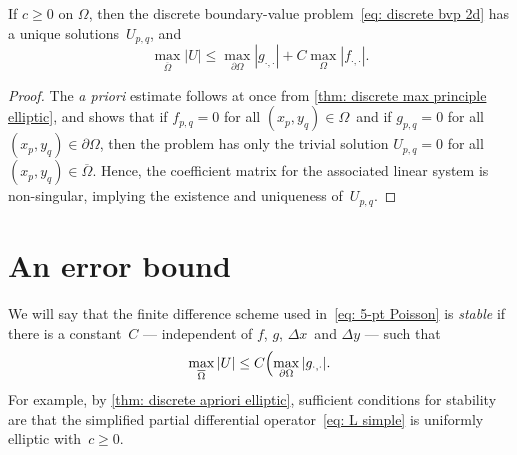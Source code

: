\begin{theorem}\label{thm: discrete apriori elliptic}
If $c\ge0$ on $\Omega$, then the discrete boundary-value 
problem~\eqref{eq: discrete bvp 2d} has a unique solutions~$U_{p,q}$, and
\[
\max_{\overline{\Omega}}|U|\le\max_{\partial\Omega}|g_{\cdot,\cdot}|
	+C\max_\Omega|f_{\cdot,\cdot}|.
\]
\end{theorem}
\begin{proof}
The \emph{a priori} estimate follows at once from 
\cref{thm: discrete max principle elliptic}, and shows that if $f_{p,q}=0$
for all $(x_p,y_q)\in\Omega$~and if $g_{p,q}=0$ for all 
$(x_p,y_q)\in\partial\Omega$, then the problem has only the trivial solution
$U_{p,q}=0$ for all $(x_p,y_q)\in\overline{\Omega}$. Hence, the coefficient
matrix for the associated linear system is non-singular, implying the
existence and uniqueness of~$U_{p,q}$.
\end{proof}

\section{An error bound}

We will say that the finite difference scheme used in~\eqref{eq: 5-pt Poisson}
is \emph{stable} if there is a constant~$C$ --- independent of $f$, $g$,
$\Delta x$~and $\Delta y$ --- such that
\begin{equation}\label{eq: stability elliptic Omega}
\max_{\overline{\Omega}}|U|\le C\Bigl(\max_{\partial\Omega}|g_{\cdot,\cdot}|.
\end{equation}
For example, by \cref{thm: discrete apriori elliptic}, sufficient conditions
for stability are that the simplified partial differential 
operator~\eqref{eq: L simple} is uniformly elliptic with~$c\ge0$.  

